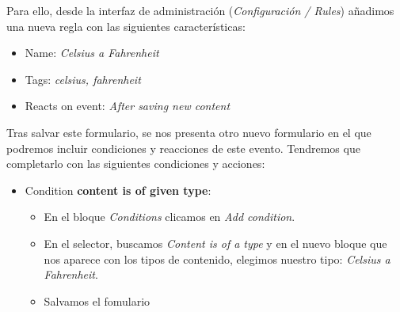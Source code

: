 Para ello, desde la interfaz de administración (\textit{Configuración / Rules}) añadimos una nueva regla con 
las siguientes características:

\begin{itemize}
  \item Name: \textit{Celsius a Fahrenheit}
  \item Tags: \textit{celsius, fahrenheit}
  \item Reacts on event: \textit{After saving new content}  
\end{itemize}

Tras salvar este formulario, se nos presenta otro nuevo formulario en el que podremos incluir condiciones y 
reacciones de este evento. Tendremos que completarlo con las siguientes condiciones y acciones:

\begin{itemize}
  \item Condition \textbf{content is of given type}:
  
  \begin{itemize}
    \item En el bloque \textit{Conditions} clicamos en \textit{Add condition}.
    \item En el selector, buscamos \textit{Content is of a type} y en el nuevo bloque que nos aparece con los 
    tipos de contenido, elegimos nuestro tipo: \textit{Celsius a Fahrenheit}.
    \item Salvamos el fomulario 
	\end{itemize}
	

\end{itemize}
